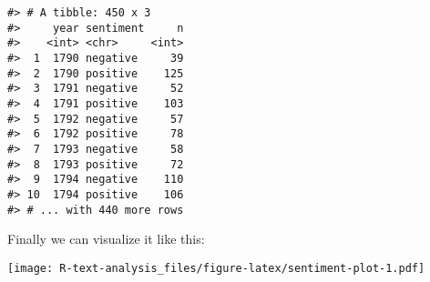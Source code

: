 \documentclass[]{book}
\newenvironment{Shaded}{\begin{snugshade}}{\end{snugshade}}
\newcommand{\CommentTok}[1]{\textcolor[rgb]{0.56,0.35,0.01}{\textit{#1}}}
\newcommand{\DataTypeTok}[1]{\textcolor[rgb]{0.13,0.29,0.53}{#1}}
\newcommand{\DecValTok}[1]{\textcolor[rgb]{0.00,0.00,0.81}{#1}}
\newcommand{\KeywordTok}[1]{\textcolor[rgb]{0.13,0.29,0.53}{\textbf{#1}}}
\newcommand{\NormalTok}[1]{#1}
\newcommand{\OperatorTok}[1]{\textcolor[rgb]{0.81,0.36,0.00}{\textbf{#1}}}
\newcommand{\StringTok}[1]{\textcolor[rgb]{0.31,0.60,0.02}{#1}}
\begin{document}
\begin{Shaded}
\end{Shaded}

\begin{verbatim}
#> # A tibble: 450 x 3
#>     year sentiment     n
#>    <int> <chr>     <int>
#>  1  1790 negative     39
#>  2  1790 positive    125
#>  3  1791 negative     52
#>  4  1791 positive    103
#>  5  1792 negative     57
#>  6  1792 positive     78
#>  7  1793 negative     58
#>  8  1793 positive     72
#>  9  1794 negative    110
#> 10  1794 positive    106
#> # ... with 440 more rows
\end{verbatim}

Finally we can visualize it like this:

\begin{Shaded}
\end{Shaded}

\texttt{[image: R-text-analysis\_files/figure-latex/sentiment-plot-1.pdf]}


\end{document}
